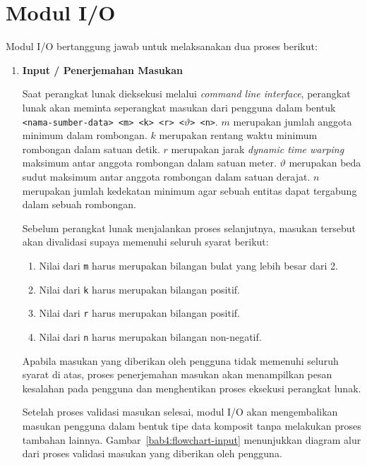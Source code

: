 \section{Modul I/O}
\label{sec:des-io}

Modul I/O bertanggung jawab untuk melaksanakan dua proses berikut:

\begin{enumerate}
    \item \textbf{Input / Penerjemahan Masukan}
    
    Saat perangkat lunak dieksekusi melalui \textit{command line interface}, perangkat lunak akan meminta seperangkat masukan dari pengguna dalam bentuk \texttt{<nama-sumber-data> <m> <k> <r> <$\vartheta$> <n>}. $m$ merupakan jumlah anggota minimum dalam rombongan. $k$ merupakan rentang waktu minimum rombongan dalam satuan detik. $r$ merupakan jarak \textit{dynamic time warping} maksimum antar anggota rombongan dalam satuan meter. $\vartheta$ merupakan beda sudut maksimum antar anggota rombongan dalam satuan derajat. $n$ merupakan jumlah kedekatan minimum agar sebuah entitas dapat tergabung dalam sebuah rombongan.
    
    Sebelum perangkat lunak menjalankan proses selanjutnya, masukan tersebut akan divalidasi supaya memenuhi seluruh syarat berikut:
    
    \begin{enumerate}
        \item Nilai dari \texttt{m} harus merupakan bilangan bulat yang lebih besar dari 2.
        \item Nilai dari \texttt{k} harus merupakan bilangan positif.
        \item Nilai dari \texttt{r} harus merupakan bilangan positif.
        \item Nilai dari \texttt{n} harus merupakan bilangan non-negatif.
    \end{enumerate}
    
    Apabila masukan yang diberikan oleh pengguna tidak memenuhi seluruh syarat di atas, proses penerjemahan masukan akan menampilkan pesan kesalahan pada pengguna dan menghentikan proses eksekusi perangkat lunak.
    
    Setelah proses validasi masukan selesai, modul I/O akan mengembalikan masukan pengguna dalam bentuk tipe data komposit tanpa melakukan proses tambahan lainnya. Gambar~\ref{bab4:flowchart-input} menunjukkan diagram alur dari proses validasi masukan yang diberikan oleh pengguna.
    

\end{enumerate}

